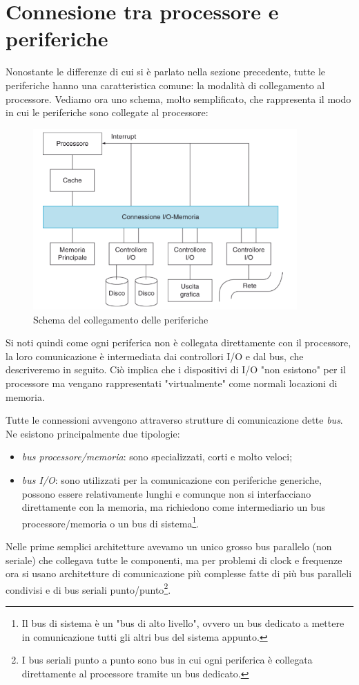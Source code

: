 \documentclass[class=book, crop=false, oneside]{standalone}
\begin{document}
\section{Connesione tra processore e periferiche}
Nonostante le differenze di cui si è parlato nella sezione precedente, tutte le periferiche hanno una caratteristica comune: la modalità di collegamento al processore. Vediamo ora uno schema, molto semplificato, che rappresenta il modo in cui le periferiche sono collegate al processore:
\begin{figure}[H]
	\centering
	\includegraphics[width=0.9\textwidth,keepaspectratio]{schema-periferiche}
	\caption{Schema del collegamento delle periferiche}
\end{figure}
Si noti quindi come ogni periferica non è collegata direttamente con il processore, la loro comunicazione è intermediata dai controllori I/O e dal bus, che descriveremo in seguito.
Ciò implica che i dispositivi di I/O "non esistono" per il processore ma vengano rappresentati "virtualmente" come normali locazioni di memoria.

Tutte le connessioni avvengono attraverso strutture di comunicazione dette \emph{bus}. Ne esistono principalmente due tipologie:
\begin{itemize}
	\item \emph{bus processore/memoria}: sono specializzati, corti e molto veloci;
	\item \emph{bus I/O}: sono utilizzati per la comunicazione con periferiche generiche, possono essere relativamente lunghi e comunque non si interfacciano direttamente con la memoria, ma richiedono come intermediario un bus processore/memoria o un bus di sistema\footnote{Il bus di sistema è un "bus di alto livello", ovvero un bus dedicato a  mettere in comunicazione tutti gli altri bus del sistema appunto.}.
\end{itemize}
Nelle prime semplici architetture avevamo un unico grosso bus parallelo (non seriale) che collegava tutte le componenti, ma per problemi di clock e frequenze ora si usano architetture di comunicazione più complesse fatte di più bus paralleli condivisi e di bus seriali punto/punto\footnote{I bus seriali punto a punto sono bus in cui ogni periferica è collegata direttamente al processore tramite un bus dedicato.}.
\end{document}
